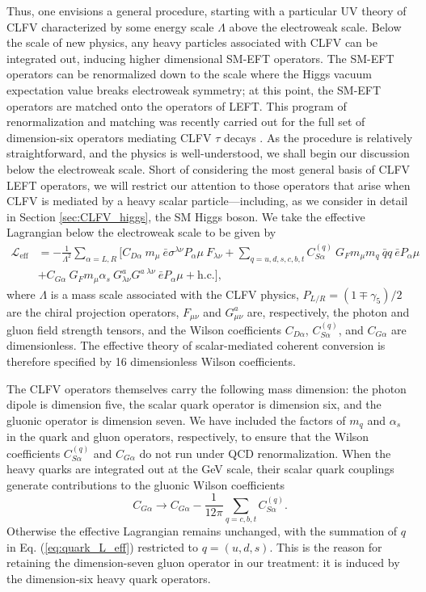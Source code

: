 \documentclass{book}[letterpaper,12pt]
\begin{document}
Thus, one envisions a general procedure, starting with a particular UV theory of CLFV characterized by some energy scale $\Lambda$ above the electroweak scale. Below the scale of new physics, any heavy particles associated with CLFV can be integrated out, inducing higher dimensional SM-EFT operators. The SM-EFT operators can be renormalized down to the scale where the Higgs vacuum expectation value breaks electroweak symmetry; at this point, the SM-EFT operators are matched onto the operators of LEFT. This program of renormalization and matching was recently carried out for the full set of dimension-six operators mediating CLFV $\tau$ decays \cite{Cirigliano:2021img}. As the procedure is relatively straightforward, and the physics is well-understood, we shall begin our discussion below the electroweak scale. Short of considering the most general basis of CLFV LEFT operators, we will restrict our attention to those operators that arise when CLFV is mediated by a heavy scalar particle---including, as we consider in detail in Section \ref{sec:CLFV_higgs}, the SM Higgs boson. We take the effective Lagrangian below the electroweak scale to be given by
\begin{equation}
\begin{split}
\mathcal{L}_\mathrm{eff}&=-\frac{1}{\Lambda^2}\sum_{\alpha=L,R}\bigg[C_{D\alpha}~m_{\mu}~\bar{e}\sigma^{\lambda\nu}P_{\alpha}\mu~F_{\lambda\nu}+\sum_{q=u,d,s,c,b,t}C^{(q)}_{S\alpha}~G_Fm_{\mu}m_q~\bar{q}q~\bar{e}P_{\alpha}\mu\\
&+C_{G\alpha}~G_Fm_{\mu}\alpha_s~G^a_{\lambda\nu}G^{a\;\lambda\nu}~\bar{e}P_{\alpha}\mu+\mathrm{h.c.}\bigg],
\label{eq:quark_L_eff}
\end{split}
\end{equation}
where $\Lambda$ is a mass scale associated with the CLFV physics, $P_{L/R}=\left(1\mp \gamma_5\right)/2$ are the chiral projection operators, $F_{\mu\nu}$ and $G^a_{\mu\nu}$ are, respectively, the photon and gluon field strength tensors, and the Wilson coefficients $C_{D\alpha}$, $C_{S\alpha}^{(q)}$, and $C_{G\alpha}$ are dimensionless. The effective theory of scalar-mediated coherent conversion is therefore specified by 16 dimensionless Wilson coefficients. 

The CLFV operators themselves carry the following mass dimension: the photon dipole is dimension five, the scalar quark operator is dimension six, and the gluonic operator is dimension seven. We have included the factors of $m_q$ and $\alpha_s$ in the quark and gluon operators, respectively, to ensure that the Wilson coefficients $C_{S\alpha}^{(q)}$ and $C_{G\alpha}$ do not run under QCD renormalization. When the heavy quarks are integrated out at the GeV scale, their scalar quark couplings generate contributions to the gluonic Wilson coefficients
\begin{equation}
C_{G\alpha}\rightarrow C_{G\alpha}-\frac{1}{12\pi}\sum_{q=c,b,t}C^{(q)}_{S\alpha}.
\end{equation}
Otherwise the effective Lagrangian remains unchanged, with the summation of $q$ in Eq. (\ref{eq:quark_L_eff}) restricted to $q=(u,d,s)$. This is the reason for retaining the dimension-seven gluon operator in our treatment: it is induced by the dimension-six heavy quark operators.
\end{document}
